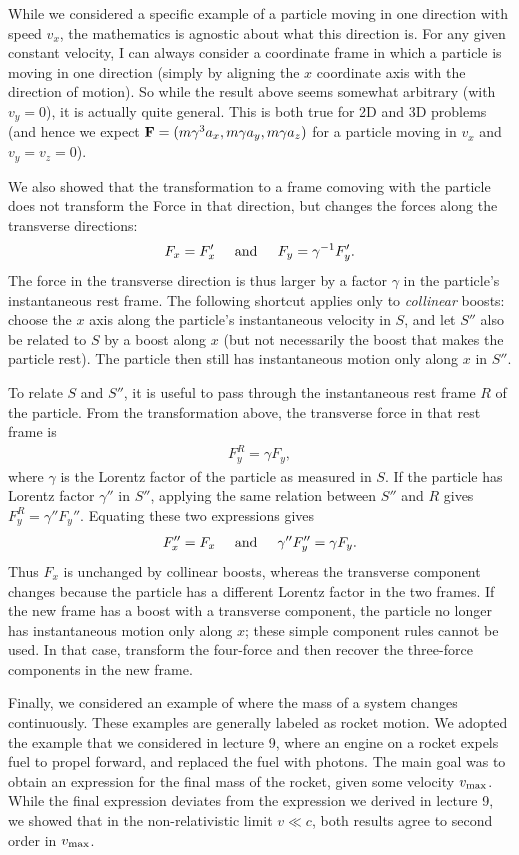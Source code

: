 \documentclass[12pt]{article}
\newcommand{\be}{\begin{eqnarray}}
\newcommand{\ee}{\end{eqnarray}}
\begin{document}
While we considered a specific example of a particle moving in one direction with speed $v_x$, the mathematics is agnostic about what this direction is. For any given constant velocity, I can always consider a coordinate frame in which a particle is moving in one direction (simply by aligning the $x$ coordinate axis with the direction of motion). So while the result above seems somewhat arbitrary (with $v_y = 0$), it is actually quite general. This is both true for 2D and 3D problems (and hence we expect ${\bf F} = (m\gamma^3 a_x, m \gamma a_y, m \gamma a_z)$ for a particle moving in $v_x$ and $v_y = v_z = 0$). 

We also showed that the transformation to a frame comoving with the particle does not transform the Force in that direction, but changes the forces along the transverse directions:
\be
F_x = F_x'\;\;\;\;\;{\rm and}\;\;\;\;\ F_y = \gamma^{-1}F_y'.
\ee
The force in the transverse direction is thus larger by a factor $\gamma$ in the particle's instantaneous rest frame. The following shortcut applies only to \emph{collinear} boosts: choose the $x$ axis along the particle's instantaneous velocity in $S$, and let $S''$ also be related to $S$ by a boost along $x$ (but not necessarily the boost that makes the particle rest). The particle then still has instantaneous motion only along $x$ in $S''$.

To relate $S$ and $S''$, it is useful to pass through the instantaneous rest frame $R$ of the particle. From the transformation above, the transverse force in that rest frame is
\be
F_y^{R}=\gamma F_y,
\ee
where $\gamma$ is the Lorentz factor of the particle as measured in $S$. If the particle has Lorentz factor $\gamma''$ in $S''$, applying the same relation between $S''$ and $R$ gives $F_y^{R}=\gamma''F_y''$. Equating these two expressions gives
\be
F_x'' = F_x\;\;\;\;\;{\rm and}\;\;\;\;\ \gamma''F_y'' = \gamma F_y.
\ee
Thus $F_x$ is unchanged by collinear boosts, whereas the transverse component changes because the particle has a different Lorentz factor in the two frames. If the new frame has a boost with a transverse component, the particle no longer has instantaneous motion only along $x$; these simple component rules cannot be used. In that case, transform the four-force and then recover the three-force components in the new frame.

Finally, we considered an example of where the mass of a system changes continuously. These examples are generally labeled as rocket motion. We adopted the example that we considered in lecture 9, where an engine on a rocket expels fuel to propel forward, and replaced the fuel with photons. The main goal was to obtain an expression for the final mass of the rocket, given some velocity $v_{\rm max}$. While the final expression deviates from the expression we derived in lecture 9, we showed that in the non-relativistic limit $v\ll c$, both results agree to second order in $v_{\rm max}$. 
\end{document}
